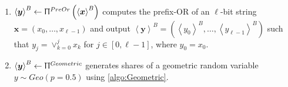 \begin{enumerate}


      \item $\left\langle \boldsymbol{y}\right\rangle^B \gets \Uppi^{PreOr}\left(\left\langle \boldsymbol{x}\right\rangle ^B\right) $ computes the prefix-OR of an $\ell$-bit string $ \boldsymbol{x}= \left( x_{0},\ldots,  x_{\ell-1}\right) $ and output $\left\langle \boldsymbol{y}\right\rangle^B= \left(\left\langle y_{0}\right\rangle ^B,\ldots, \left\langle y_{\ell-1}\right\rangle ^B\right) $ such that $ y_{j} = \lor _{k=0}^{j}  x_{k} $ for $j \in \left[0,\ell-1\right] $, where $ y_{0} = x_{0} $.

      \item $\left\langle \boldsymbol{y}\right\rangle^{B} \gets \Uppi^{Geometric} $ generates shares of a geometric random variable $y\sim Geo\left(p=0.5\right) $ using \autoref{algo:Geometric}.


\end{enumerate}
